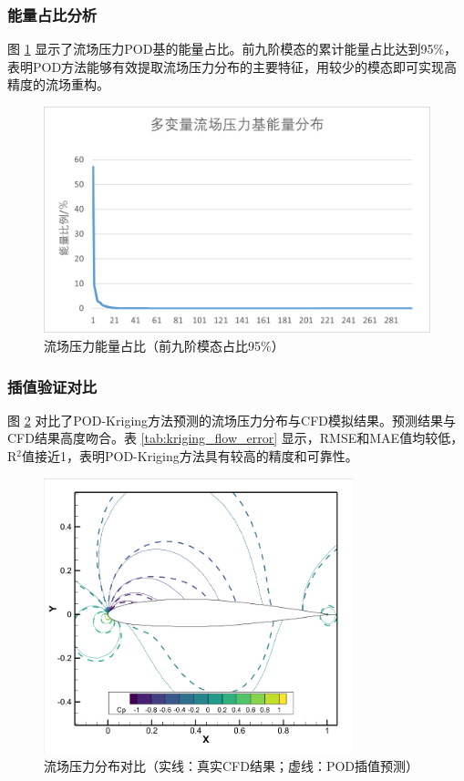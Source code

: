\subsubsection{能量占比分析}

图 \ref{fig:kriging_flow_energy} 显示了流场压力POD基的能量占比。前九阶模态的累计能量占比达到95\%，表明POD方法能够有效提取流场压力分布的主要特征，用较少的模态即可实现高精度的流场重构。

\begin{figure}[H]
    \centering
    \includegraphics[width=0.8\linewidth]{image/基能量分布/多变量流场压力基能量分布.png}
    \caption{\songti 流场压力能量占比（前九阶模态占比95\%）}
    \label{fig:kriging_flow_energy}
\end{figure}

\subsubsection{插值验证对比}

图 \ref{fig:kriging_flow_validation} 对比了POD-Kriging方法预测的流场压力分布与CFD模拟结果。预测结果与CFD结果高度吻合。表 \ref{tab:kriging_flow_error} 显示，RMSE和MAE值均较低，R$^2$值接近1，表明POD-Kriging方法具有较高的精度和可靠性。

\begin{figure}[H]
    \centering
    \includegraphics[width=0.8\textwidth]{image/多变量流场预测值与真实值对比结果图/多变量对比图2!.png}
    \caption{流场压力分布对比（实线：真实CFD结果；虚线：POD插值预测）}
    \label{fig:kriging_flow_validation}
\end{figure}

